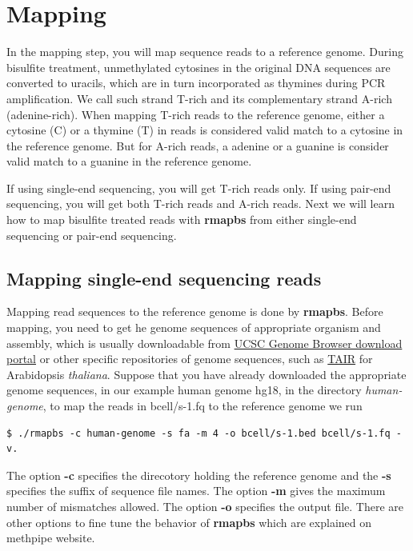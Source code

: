 \documentclass{article}
\begin{document}
\section{Mapping}
\label{sec:mapping}


In the mapping step, you will map sequence reads to a reference
genome. During bisulfite treatment, unmethylated cytosines in the
original DNA sequences are converted to uracils, which are in turn
incorporated as thymines during PCR amplification. We call such strand
T-rich and its complementary strand A-rich (adenine-rich).  When
mapping T-rich reads to the reference genome, either a cytosine (C) or
a thymine (T) in reads is considered valid match to a cytosine in the
reference genome. But for A-rich reads, a adenine or a guanine is
consider valid match to a guanine in the reference genome.    

If using single-end sequencing, you will get T-rich reads only. If
using pair-end sequencing, you will get both T-rich reads and A-rich
reads. Next we will learn how to map bisulfite treated reads with
\textbf{rmapbs} from either single-end sequencing or pair-end
sequencing. 

\subsection{Mapping single-end sequencing reads}
\label{sec:mapping-single-end}
Mapping read sequences to the reference genome is done by
\textbf{rmapbs}. Before mapping, you need to get he genome sequences
of appropriate organism and assembly, which is usually downloadable
from \href{http://hgdownload.cse.ucsc.edu/downloads.html}{UCSC Genome
  Browser download portal} or other specific repositories of genome
sequences, such as \href{http://www.arabidopsis.org/}{TAIR} for
Arabidopsis \textit{thaliana}. Suppose that you have already
downloaded the appropriate genome sequences, in our example human
genome hg18, in the directory \textit{human-genome}, to map the reads
in bcell/s-1.fq to the reference genome we run
\begin{verbatim}
$ ./rmapbs -c human-genome -s fa -m 4 -o bcell/s-1.bed bcell/s-1.fq -v. 
\end{verbatim}
The option \textbf{-c} specifies the direcotory holding the reference
genome and the \textbf{-s} specifies the suffix of sequence file
names. The option \textbf{-m} gives the maximum number of mismatches
allowed. The option \textbf{-o} specifies the output file. There are
other options to fine tune the behavior of \textbf{rmapbs} which are
explained on methpipe website.  
\end{document}
